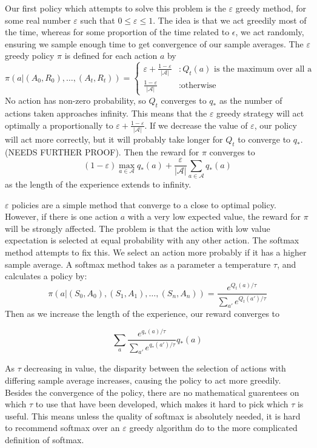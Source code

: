 \documentclass{report}
\begin{document}
Our first policy which attempts to solve this problem is the $\varepsilon$ greedy method, for some real number $\varepsilon$ such that $0 \leq \varepsilon \leq 1$. The idea is that we act greedily most of the time, whereas for some proportion of the time related to $\epsilon$, we act randomly, ensuring we sample enough time to get convergence of our sample averages. The $\varepsilon$ greedy policy $\pi$ is defined for each action $a$ by
%
\[ \pi(a|(A_0,R_0), \dots ,(A_t,R_t)) =
        \begin{cases} \varepsilon + \frac{1 - \varepsilon}{|\mathcal{A}|} &: Q_t(a) \text{ is the maximum over all a}\\
        \frac{1 - \varepsilon}{|\mathcal{A}|} &: \text{otherwise}
        \end{cases} \]
%
\noindent No action has non-zero probability, so $Q_t$ converges to $q_*$ as the number of actions taken approaches infinity. This means that the $\varepsilon$ greedy strategy will act optimally a proportionally to $\varepsilon + \frac{1 - \varepsilon}{|\mathcal{A}|}$. If we decrease the value of $\varepsilon$, our policy will act more correctly, but it will probably take longer for $Q_t$ to converge to $q_*$. (NEEDS FURTHER PROOF). Then the reward for $\pi$ converges to
%
\[ (1 - \varepsilon) \max_{a \in \mathcal{A}} q_*(a) + \frac{\varepsilon}{|\mathcal{A}|}\sum_{a \in \mathcal{A}} q_*(a) \]
%
\noindent as the length of the experience extends to infinity.

$\varepsilon$ policies are a simple method that converge to a close to optimal policy. However, if there is one action $a$ with a very low expected value, the reward for $\pi$ will be strongly affected. The problem is that the action with low value expectation is selected at equal probability with any other action. The softmax method attempts to fix this. We select an action more probably if it has a higher sample average. A softmax method takes as a parameter a temperature $\tau$, and calculates a policy by:
%
\[ \pi(a|(S_0,A_0),(S_1,A_1),\dots,(S_n,A_n)) =
        \frac{e^{Q_t(a)/\tau}}{\sum_{a'} e^{Q_t(a')/\tau}}\]
%
Then as we increase the length of the experience, our reward converges to

\[ \sum_a \frac{e^{q_*(a)/\tau}}{\sum_{a'} e^{q_*(a')/\tau}} q_*(a) \]

As $\tau$ decreasing in value, the disparity between the selection of actions with differing sample average increases, causing the policy to act more greedily. Besides the convergence of the policy, there are no mathematical guarentees on which $\tau$ to use that have been developed, which makes it hard to pick which $\tau$ is useful. This means unless the quality of softmax is absolutely needed, it is hard to recommend softmax over an $\varepsilon$ greedy algorithm do to the more complicated definition of softmax.
\end{document}
